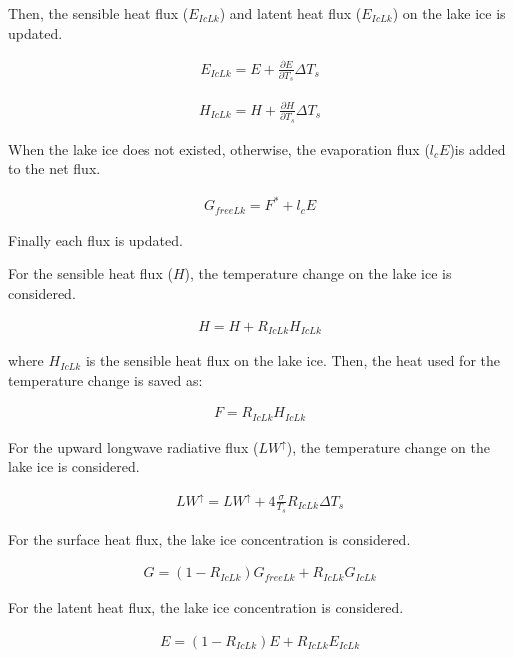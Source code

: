 Then, the sensible heat flux (\(E_{IcLk}\)) and latent heat flux
(\(E_{IcLk}\)) on the lake ice is updated.

\begin{eqnarray}
    E_{IcLk} = E + \frac{\partial E}{\partial T_s}\Delta T_s
\end{eqnarray}

\begin{eqnarray}
    H_{IcLk} = H + \frac{\partial H}{\partial T_s}\Delta T_s
\end{eqnarray}

When the lake ice does not existed, otherwise, the evaporation flux
(\(l_cE\))is added to the net flux.

\begin{eqnarray}
    G_{freeLk}=F^* + l_cE
\end{eqnarray}

Finally each flux is updated.

For the sensible heat flux (\(H\)), the temperature change on the lake
ice is considered.

\begin{eqnarray}
    H=H+ R_{IcLk}  H_{IcLk}
\end{eqnarray}

where \(H_{IcLk}\) is the sensible heat flux on the lake ice. Then, the
heat used for the temperature change is saved as:

\begin{eqnarray}
    F = R_{IcLk} H_{IcLk}
\end{eqnarray}

For the upward longwave radiative flux (\(LW^\uparrow\)), the
temperature change on the lake ice is considered.

\begin{eqnarray}
    LW^\uparrow=LW^\uparrow +  4\frac{\sigma}{T_s}R_{IcLk}  \Delta T_s
\end{eqnarray}

For the surface heat flux, the lake ice concentration is considered.

\begin{eqnarray}
    G=(1-R_{IcLk})G_{freeLk} + R_{IcLk}G_{IcLk}
\end{eqnarray}

For the latent heat flux, the lake ice concentration is considered.

\begin{eqnarray}
    E=(1-R_{IcLk})E + R_{IcLk}E_{IcLk}
\end{eqnarray}

